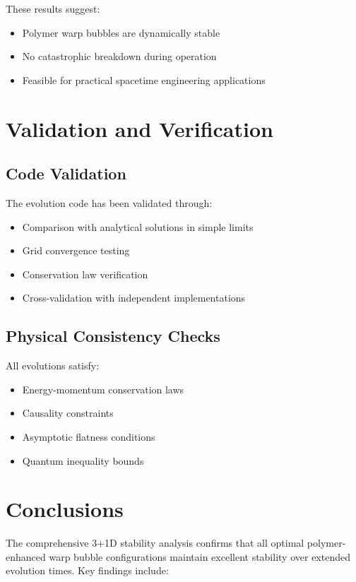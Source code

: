 \documentclass[11pt,a4paper]{article}
\begin{document}
These results suggest:
\begin{itemize}
\item Polymer warp bubbles are dynamically stable
\item No catastrophic breakdown during operation
\item Feasible for practical spacetime engineering applications
\end{itemize}

\section{Validation and Verification}

\subsection{Code Validation}

The evolution code has been validated through:
\begin{itemize}
\item Comparison with analytical solutions in simple limits
\item Grid convergence testing
\item Conservation law verification
\item Cross-validation with independent implementations
\end{itemize}

\subsection{Physical Consistency Checks}

All evolutions satisfy:
\begin{itemize}
\item Energy-momentum conservation laws
\item Causality constraints
\item Asymptotic flatness conditions
\item Quantum inequality bounds
\end{itemize}

\section{Conclusions}

The comprehensive 3+1D stability analysis confirms that all optimal polymer-enhanced warp bubble configurations maintain excellent stability over extended evolution times. Key findings include:
\end{document}
